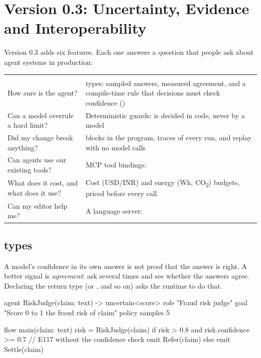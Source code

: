 \chapter{Version 0.3: Uncertainty, Evidence and Interoperability}
\label{ch:v03}

Version 0.3 adds six features. Each one answers a question that people ask about agent systems in production:

\begin{center}
\small
\begin{tabularx}{\linewidth}{@{}L{3.6cm}Y@{}}
\toprule
{} & \\
\goldrule
How sure is the agent? &  types: sampled answers, measured agreement, and a compile-time rule that decisions must check confidence ()\\
Can a model overrule a hard limit? & Deterministic guards:  is decided in code, never by a model\\
Did my change break anything? &  blocks in the program, traces of every run, and replay with no model calls\\
Can agents use our existing tools? & MCP tool bindings: \\
What does it cost, and what does it use? & Cost (USD/INR) and energy (Wh, CO\textsubscript{2}) budgets, priced before every call\\
Can my editor help me? & A language server: \\
\bottomrule
\end{tabularx}
\end{center}

\section{\texorpdfstring{}{uncertain<T>} types}

A model's confidence in its own answer is not proof that the answer is right. A better signal is \emph{agreement}: ask several times and see whether the answers agree. Declaring the return type  (or , and so on) asks the runtime to do that.

\begin{algo}[title=Sampling and the confidence rule]
agent RiskJudge(claim: text) -> uncertain<score> {
    role   "Fraud risk judge"
    goal   "Score 0 to 1 the fraud risk of {claim}"
    policy { samples 5 }
}

flow main(claim: text) {
    risk = RiskJudge(claim)
    if risk > 0.8 and risk.confidence >= 0.7 {      // E117 without the confidence check
        emit Refer(claim)
    } else {
        emit Settle(claim)
    }
}
\end{algo}

